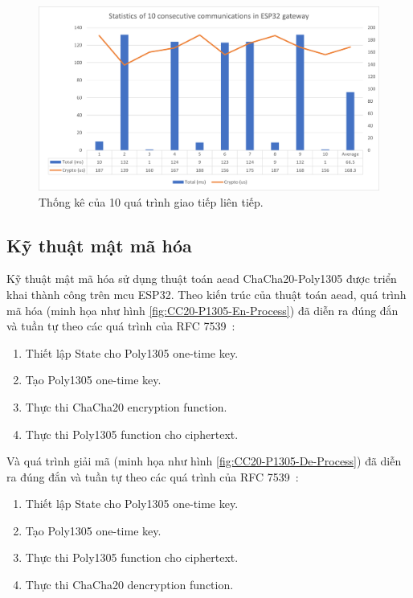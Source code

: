 \begin{figure}[htp]
\centering
\includegraphics[width=1.0\linewidth]{images/fig-10-measure-commu-physic.png}
\caption{Thống kê của 10 quá trình giao tiếp liên tiếp.}
\label{fig:10-measure-commu-physic}
\end{figure}

\subsection{Kỹ thuật mật mã hóa}
Kỹ thuật mật mã hóa sử dụng thuật toán \acrshort{aead} ChaCha20-Poly1305 được triển khai thành công trên \acrshort{mcu} ESP32. Theo kiến trúc của thuật toán \acrshort{aead}, quá trình mã hóa (minh họa như hình \ref{fig:CC20-P1305-En-Process}) đã diễn ra đúng đắn và tuần tự theo các quá trình của RFC 7539~\cite{rfc7539}:

\begin{enumerate}
    \item Thiết lập State cho Poly1305 one-time key.
    \item Tạo Poly1305 one-time key.
    \item Thực thi ChaCha20 encryption function.
    \item Thực thi Poly1305 function cho ciphertext.
\end{enumerate}

Và quá trình giải mã (minh họa như hình \ref{fig:CC20-P1305-De-Process}) đã diễn ra đúng đắn và tuần tự theo các quá trình của RFC 7539~\cite{rfc7539}:

\begin{enumerate}
    \item Thiết lập State cho Poly1305 one-time key.
    \item Tạo Poly1305 one-time key.
    \item Thực thi Poly1305 function cho ciphertext.
    \item Thực thi ChaCha20 dencryption function.
\end{enumerate}

